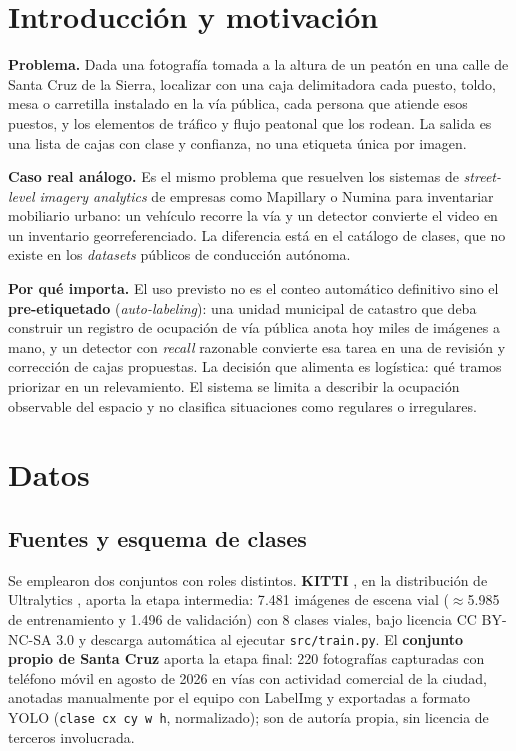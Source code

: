 \documentclass[10pt,a4paper]{article}
\begin{document}
\section{Introducción y motivación}
\textbf{Problema.} Dada una fotografía tomada a la altura de un peatón en una calle de
Santa Cruz de la Sierra, localizar con una caja delimitadora cada puesto, toldo, mesa o
carretilla instalado en la vía pública, cada persona que atiende esos puestos, y los
elementos de tráfico y flujo peatonal que los rodean. La salida es una lista de cajas con
clase y confianza, no una etiqueta única por imagen.

\textbf{Caso real análogo.} Es el mismo problema que resuelven los sistemas de
\emph{street-level imagery analytics} de empresas como Mapillary o Numina para
inventariar mobiliario urbano: un vehículo recorre la vía y un detector convierte el
video en un inventario georreferenciado. La diferencia está en el catálogo de clases, que
no existe en los \emph{datasets} públicos de conducción autónoma.

\textbf{Por qué importa.} El uso previsto no es el conteo automático definitivo sino el
\textbf{pre-etiquetado} (\emph{auto-labeling}): una unidad municipal de catastro que deba
construir un registro de ocupación de vía pública anota hoy miles de imágenes a mano, y un
detector con \emph{recall} razonable convierte esa tarea en una de revisión y corrección
de cajas propuestas. La decisión que alimenta es logística: qué tramos priorizar en un
relevamiento. El sistema se limita a describir la ocupación observable del espacio y no
clasifica situaciones como regulares o irregulares.

\section{Datos}
\subsection{Fuentes y esquema de clases}
Se emplearon dos conjuntos con roles distintos. \textbf{KITTI} \cite{kitti}, en la
distribución de Ultralytics \cite{ultralytics}, aporta la etapa intermedia: 7{.}481
imágenes de escena vial ($\approx$5{.}985 de entrenamiento y 1{.}496 de validación) con 8
clases viales, bajo licencia CC BY-NC-SA 3.0 y descarga automática al ejecutar
\texttt{src/train.py}. El \textbf{conjunto propio de Santa Cruz} aporta la etapa final:
220 fotografías capturadas con teléfono móvil en agosto de 2026 en vías con actividad
comercial de la ciudad, anotadas manualmente por el equipo con LabelImg \cite{labelimg} y
exportadas a formato YOLO (\texttt{clase cx cy w h}, normalizado); son de autoría propia,
sin licencia de terceros involucrada.
\end{document}
